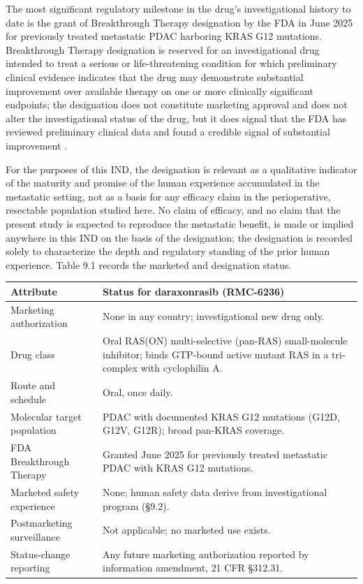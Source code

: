 The most significant regulatory milestone in the drug's investigational history to
date is the grant of Breakthrough Therapy designation by the FDA in June 2025 for
previously treated metastatic PDAC harboring KRAS G12 mutations. Breakthrough
Therapy designation is reserved for an investigational drug intended to treat a
serious or life-threatening condition for which preliminary clinical evidence
indicates that the drug may demonstrate substantial improvement over available
therapy on one or more clinically significant endpoints; the designation does not
constitute marketing approval and does not alter the investigational status of the
drug, but it does signal that the FDA has reviewed preliminary clinical data and
found a credible signal of substantial improvement \cite{daraxwhipple,
phase1guidance}. 

For the purposes of this IND, the designation is relevant as a
qualitative indicator of the maturity and promise of the human experience
accumulated in the metastatic setting, not as a basis for any efficacy claim in the
perioperative, resectable population studied here. No claim of efficacy, and no
claim that the present study is expected to reproduce the metastatic benefit, is
made or implied anywhere in this IND on the basis of the designation; the
designation is recorded solely to characterize the depth and regulatory standing
of the prior human experience. Table 9.1 records the marketed and designation
status.

\noindent\begin{tabularx}{\textwidth}{L{4.4cm} Y}
\toprule
\textbf{Attribute} & \textbf{Status for daraxonrasib (RMC-6236)} \\
\midrule
Marketing authorization & None in any country; investigational new drug only. \\
Drug class & Oral RAS(ON) multi-selective (pan-RAS) small-molecule inhibitor; binds GTP-bound active mutant RAS in a tri-complex with cyclophilin A. \\
Route and schedule & Oral, once daily. \\
Molecular target population & PDAC with documented KRAS G12 mutations (G12D, G12V, G12R); broad pan-KRAS coverage. \\
FDA Breakthrough Therapy & Granted June 2025 for previously treated metastatic PDAC with KRAS G12 mutations. \\
Marketed safety experience & None; human safety data derive from investigational program (\S 9.2). \\
Postmarketing surveillance & Not applicable; no marketed use exists. \\
Status-change reporting & Any future marketing authorization reported by information amendment, 21 CFR \S 312.31. \\
\bottomrule
\end{tabularx}
\vspace*{-0.3cm}

